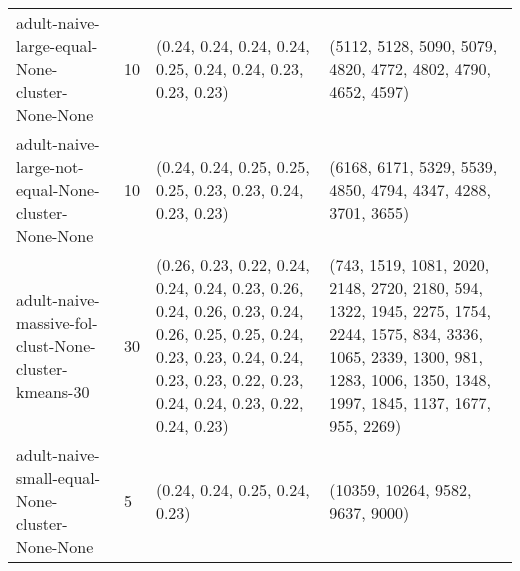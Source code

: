 \begin{longtable}{llll}
                                                               adult-naive-large-equal-None-cluster-None-None &             10 &                                                                                                                                                                                                                                              (0.24, 0.24, 0.24, 0.24, 0.25, 0.24, 0.24, 0.23, 0.23, 0.23) &                                                                                                                                                                                                                                              (5112, 5128, 5090, 5079, 4820, 4772, 4802, 4790, 4652, 4597) \\
                                                           adult-naive-large-not-equal-None-cluster-None-None &             10 &                                                                                                                                                                                                                                              (0.24, 0.24, 0.25, 0.25, 0.25, 0.23, 0.23, 0.24, 0.23, 0.23) &                                                                                                                                                                                                                                              (6168, 6171, 5329, 5539, 4850, 4794, 4347, 4288, 3701, 3655) \\
                                                         adult-naive-massive-fol-clust-None-cluster-kmeans-30 &             30 &                                                                                                                      (0.26, 0.23, 0.22, 0.24, 0.24, 0.24, 0.23, 0.26, 0.24, 0.26, 0.23, 0.24, 0.26, 0.25, 0.25, 0.24, 0.23, 0.23, 0.24, 0.24, 0.23, 0.23, 0.22, 0.23, 0.24, 0.24, 0.23, 0.22, 0.24, 0.23) &                                                                                                                           (743, 1519, 1081, 2020, 2148, 2720, 2180, 594, 1322, 1945, 2275, 1754, 2244, 1575, 834, 3336, 1065, 2339, 1300, 981, 1283, 1006, 1350, 1348, 1997, 1845, 1137, 1677, 955, 2269) \\
                                                               adult-naive-small-equal-None-cluster-None-None &              5 &                                                                                                                                                                                                                                                                            (0.24, 0.24, 0.25, 0.24, 0.23) &                                                                                                                                                                                                                                                                          (10359, 10264, 9582, 9637, 9000) \\

\end{longtable}
